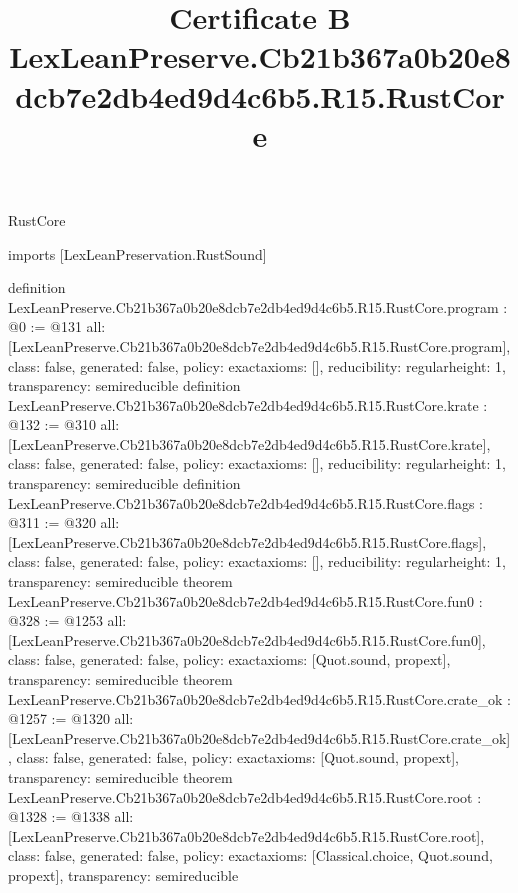 \begin{lexlean}{RustCore}
\title{Certificate B LexLeanPreserve.Cb21b367a0b20e8dcb7e2db4ed9d4c6b5.R15.RustCore}
\begin{coremodule}
imports [LexLeanPreservation.RustSound]

definition LexLeanPreserve.Cb21b367a0b20e8dcb7e2db4ed9d4c6b5.R15.RustCore.program : @0 := @131 {
  all: [LexLeanPreserve.Cb21b367a0b20e8dcb7e2db4ed9d4c6b5.R15.RustCore.program],
  class: false,
  generated: false,
  policy: exact{axioms: []},
  reducibility: regular{height: 1},
  transparency: semireducible
}
definition LexLeanPreserve.Cb21b367a0b20e8dcb7e2db4ed9d4c6b5.R15.RustCore.krate : @132 := @310 {
  all: [LexLeanPreserve.Cb21b367a0b20e8dcb7e2db4ed9d4c6b5.R15.RustCore.krate],
  class: false,
  generated: false,
  policy: exact{axioms: []},
  reducibility: regular{height: 1},
  transparency: semireducible
}
definition LexLeanPreserve.Cb21b367a0b20e8dcb7e2db4ed9d4c6b5.R15.RustCore.flags : @311 := @320 {
  all: [LexLeanPreserve.Cb21b367a0b20e8dcb7e2db4ed9d4c6b5.R15.RustCore.flags],
  class: false,
  generated: false,
  policy: exact{axioms: []},
  reducibility: regular{height: 1},
  transparency: semireducible
}
theorem LexLeanPreserve.Cb21b367a0b20e8dcb7e2db4ed9d4c6b5.R15.RustCore.fun0 : @328 := @1253 {
  all: [LexLeanPreserve.Cb21b367a0b20e8dcb7e2db4ed9d4c6b5.R15.RustCore.fun0],
  class: false,
  generated: false,
  policy: exact{axioms: [Quot.sound, propext]},
  transparency: semireducible
}
theorem LexLeanPreserve.Cb21b367a0b20e8dcb7e2db4ed9d4c6b5.R15.RustCore.crate_ok : @1257 := @1320 {
  all: [LexLeanPreserve.Cb21b367a0b20e8dcb7e2db4ed9d4c6b5.R15.RustCore.crate_ok],
  class: false,
  generated: false,
  policy: exact{axioms: [Quot.sound, propext]},
  transparency: semireducible
}
theorem LexLeanPreserve.Cb21b367a0b20e8dcb7e2db4ed9d4c6b5.R15.RustCore.root : @1328 := @1338 {
  all: [LexLeanPreserve.Cb21b367a0b20e8dcb7e2db4ed9d4c6b5.R15.RustCore.root],
  class: false,
  generated: false,
  policy: exact{axioms: [Classical.choice, Quot.sound, propext]},
  transparency: semireducible
}


\end{coremodule}
\end{lexlean}
